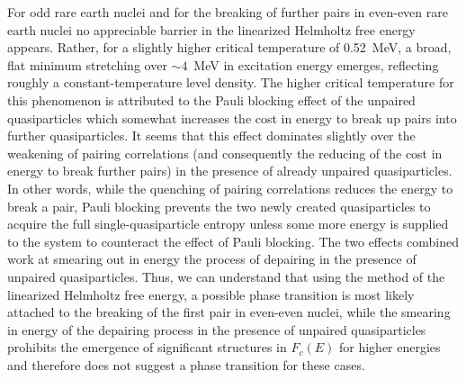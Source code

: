 \documentclass[sort&compress,final,numberedheadings]{aipproc}
\begin{document}
For odd rare earth nuclei and for the breaking of further pairs in even-even 
rare earth nuclei no appreciable barrier in the linearized Helmholtz free 
energy appears. Rather, for a slightly higher critical temperature of 0.52~MeV,
a broad, flat minimum stretching over $\sim 4$~MeV in excitation energy 
emerges, reflecting roughly a constant-temperature level density. The higher 
critical temperature for this phenomenon is attributed to the Pauli blocking 
effect of the unpaired quasiparticles which somewhat increases the cost in 
energy to break up pairs into further quasiparticles. It seems that this effect
dominates slightly over the weakening of pairing correlations (and consequently
the reducing of the cost in energy to break further pairs) in the presence of 
already unpaired quasiparticles. In other words, while the quenching of pairing
correlations reduces the energy to break a pair, Pauli blocking prevents the 
two newly created quasiparticles to acquire the full single-quasiparticle 
entropy unless some more energy is supplied to the system to counteract the 
effect of Pauli blocking. The two effects combined work at smearing out in 
energy the process of depairing in the presence of unpaired quasiparticles. 
Thus, we can understand that using the method of the linearized Helmholtz free 
energy, a possible phase transition is most likely attached to the breaking of 
the first pair in even-even nuclei, while the smearing in energy of the 
depairing process in the presence of unpaired quasiparticles prohibits the 
emergence of significant structures in $F_c(E)$ for higher energies and 
therefore does not suggest a phase transition for these cases.
\end{document}
